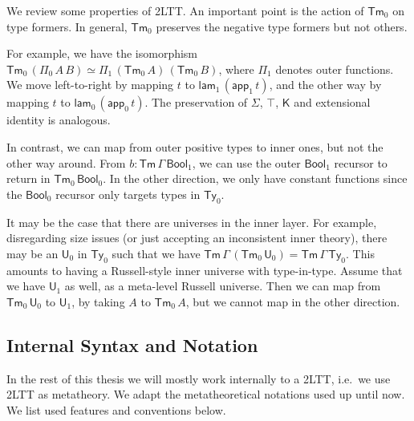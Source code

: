 \documentclass[12pt,a4paper,twoside,openany]{book}
\theoremstyle{remark}
\theoremstyle{definition}
\theoremstyle{theorem}
\newcommand{\ms}[1]{\mathsf{#1}}
\newcommand{\Tm}{\mathsf{Tm}}
\newcommand{\Ty}{\mathsf{Ty}}
\newcommand{\U}{\mathsf{U}}
\newcommand{\K}{\mathsf{K}}
\newcommand{\app}{\ms{app}}
\newcommand{\Bool}{\ms{Bool}}
\newcommand{\lam}{\ms{lam}}
\begin{document}
We review some properties of 2LTT. An important point is the action of $\Tm_0$
on type formers. In general, $\Tm_0$ preserves the negative type formers but not
others.

For example, we have the isomorphism $\Tm_0\,(\Pi_0\,A\,B) \simeq
\Pi_1\,(\Tm_0\,A)\,(\Tm_0\,B)$, where $\Pi_1$ denotes outer functions.  We move
left-to-right by mapping $t$ to $\lam_1\,(\app_1\,t)$, and the other way by
mapping $t$ to $\lam_0\,(\app_0\,t)$. The preservation of $\Sigma$, $\top$, $\K$
and extensional identity is analogous.

In contrast, we can map from outer positive types to inner ones, but not the
other way around. From $b : \Tm\,\Gamma\,\Bool_1$, we can use the outer
$\Bool_1$ recursor to return in $\Tm_0\,\Bool_0$. In the other direction, we
only have constant functions since the $\Bool_0$ recursor only targets types in
$\Ty_0$.

It may be the case that there are universes in the inner layer. For example,
disregarding size issues (or just accepting an inconsistent inner theory), there
may be an $\U_0$ in $\Ty_0$ such that we have $\Tm\,\Gamma\,(\Tm_0\,\U_0) =
\Tm\,\Gamma\,\Ty_0$. This amounts to having a Russell-style inner universe with
type-in-type. Assume that we have $\U_1$ as well, as a meta-level Russell
universe. Then we can map from $\Tm_0\,\U_0$ to $\U_1$, by taking $A$ to
$\Tm_0\,A$, but we cannot map in the other direction.

\subsection{Internal Syntax and Notation}
\label{sec:2ltt-internal-syntax}

In the rest of this thesis we will mostly work internally to a 2LTT, i.e.\ we
use 2LTT as metatheory. We adapt the metatheoretical notations used up until
now. We list used features and conventions below.
\end{document}
